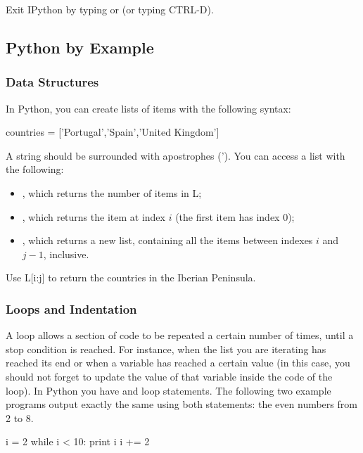Exit IPython by typing  or  (or typing CTRL-D).

\subsection{Python by Example}


\subsubsection{Data Structures}

In Python, you can create lists of items with the following syntax:

\begin{python}
countries = ['Portugal','Spain','United Kingdom']
\end{python}

A string should be surrounded with apostrophes ('). You can access a list with
the following:

\begin{itemize}
 \item {}, which returns the number of items in L;
 \item {}, which returns the item at index $i$ (the first item has index 0);
 \item {}, which returns a new list, containing all the items between indexes $i$ and $j-1$, inclusive. 
\end{itemize}

\begin{exercise}
 Use L[i:j] to return the countries in the Iberian Peninsula.
\end{exercise}

\subsubsection{Loops and Indentation}

A loop allows a section of code to be repeated a certain number of times, until a stop condition is reached. For instance, when the list you are iterating has reached its end or when a variable has reached a certain value (in this case, you should not forget to update the value of that variable inside the code of the loop). In Python you have  and  loop statements. The following two example programs output exactly the same using both statements: the even numbers from 2 to 8.

\begin{python}
i = 2
while i < 10:
  print i  
  i += 2 
\end{python}

